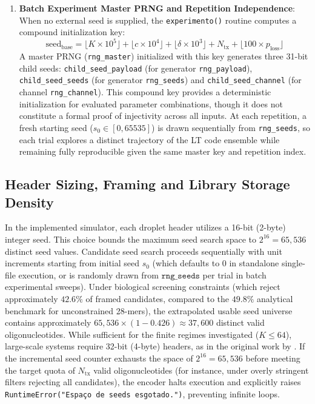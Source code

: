 \begin{enumerate}
    \item \textbf{Batch Experiment Master PRNG and Repetition Independence}: When no external seed is supplied, the \texttt{experimento()} routine computes a compound initialization key:
    \begin{equation}
        \label{eq:seed_base_arch}
        \text{seed}_{\text{base}} = \lfloor K \times 10^5 \rfloor + \lfloor c \times 10^4 \rfloor + \lfloor \delta \times 10^3 \rfloor + N_{\text{tx}} + \lfloor 100 \times p_{\text{loss}} \rfloor
    \end{equation}
    A master PRNG (\texttt{rng\_master}) initialized with this key generates three 31-bit child seeds: \texttt{child\_seed\_payload} (for generator \texttt{rng\_payload}), \texttt{child\_seed\_seeds} (for generator \texttt{rng\_seeds}) and \texttt{child\_seed\_channel} (for channel \texttt{rng\_channel}). This compound key provides a deterministic initialization for evaluated parameter combinations, though it does not constitute a formal proof of injectivity across all inputs. At each repetition, a fresh starting seed ($s_0 \in [0, 65535]$) is drawn sequentially from \texttt{rng\_seeds}, so each trial explores a distinct trajectory of the LT code ensemble while remaining fully reproducible given the same master key and repetition index.
\end{enumerate}

\subsection{Header Sizing, Framing and Library Storage Density}

In the implemented simulator, each droplet header utilizes a 16-bit (2-byte) integer seed. This choice bounds the maximum seed search space to $2^{16} = 65{,}536$ distinct seed values. Candidate seed search proceeds sequentially with unit increments starting from initial seed $s_0$ (which defaults to $0$ in standalone single-file execution, or is randomly drawn from $\texttt{rng\_seeds}$ per trial in batch experimental sweeps). Under biological screening constraints (which reject approximately $42.6\%$ of framed candidates, compared to the $49.8\%$ analytical benchmark for unconstrained 28-mers), the extrapolated usable seed universe contains approximately $65{,}536 \times (1 - 0.426) \approx 37{,}600$ distinct valid oligonucleotides. While sufficient for the finite regimes investigated ($K \le 64$), large-scale systems require 32-bit (4-byte) headers, as in the original work by . If the incremental seed counter exhausts the space of $2^{16} = 65{,}536$ before meeting the target quota of $N_{\text{tx}}$ valid oligonucleotides (for instance, under overly stringent filters rejecting all candidates), the encoder halts execution and explicitly raises \texttt{RuntimeError("Espaço de seeds esgotado.")}, preventing infinite loops.

